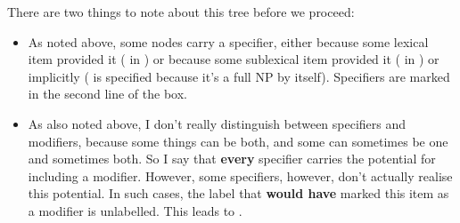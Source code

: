 \documentclass[11pt,a4paper]{article}
\begin{document}
\begin{figure}[ht]
\caption{}\label{he eats the ripe peaches .}
\end{figure}

There are two things to note about this tree before we proceed:

\begin{itemize}
\item
As noted above, some nodes carry a specifier, either because some lexical item
provided it ( in ) or because some
sublexical item provided it ( in ) or implicitly (
is specified because it's a full NP by itself). Specifiers are marked
in the second line of the box.

\item
As also noted above, I don't really distinguish between specifiers and
modifiers, because some things can be both, and some can sometimes be
one and sometimes both. So I say that \textbf{every} specifier carries
the potential for including a modifier. However, some specifiers,
however, don't actually realise this potential. In such cases, the
label that \textbf{would have} marked this item as a modifier is
unlabelled. This leads to .
\end{itemize}
\end{document}
